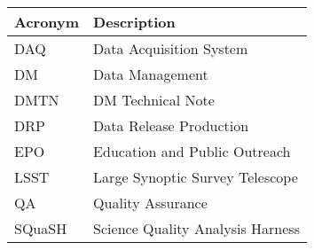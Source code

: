 \addtocounter{table}{-1}
\begin{longtable}{p{}p{}}\hline
\textbf{Acronym} & \textbf{Description}  \\\hline

DAQ & Data Acquisition System \\\hline
DM & Data Management \\\hline
DMTN & DM Technical Note \\\hline
DRP & Data Release Production \\\hline
EPO & Education and Public Outreach \\\hline
LSST & Large Synoptic Survey Telescope \\\hline
QA & Quality Assurance \\\hline
SQuaSH & Science Quality Analysis Harness \\\hline
\end{longtable}
